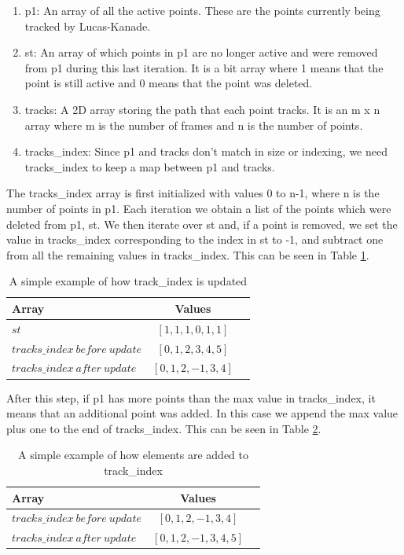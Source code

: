 \documentclass[12pt, onecolumn, conference]{IEEEtran}
\begin{document}
\begin{enumerate}
\item p1: An array of all the active points. These are the points currently being tracked by Lucas-Kanade.
\item st: An array of which points in p1 are no longer active and were removed from p1 during this last iteration. It is a bit array where 1 means that the point is still active and 0 means that the point was deleted.
\item tracks: A 2D array storing the path that each point tracks. It is an m x n array where m is the number of frames and n is the number of points.
\item tracks\_index: Since p1 and tracks don’t match in size or indexing, we need tracks\_index to keep a map between p1 and tracks.
\end{enumerate}

The tracks\_index array is first initialized with values 0 to n-1, where n is the number of points in p1. Each iteration we obtain a list of the points which were deleted from p1, st. We then iterate over st and, if a point is removed, we set the value in tracks\_index corresponding to the index in st to -1, and subtract one from all the remaining values in tracks\_index. This can be seen in Table \ref{table_index}.

\begin{table}[!t]
\caption{A simple example of how track\_index is updated}
\label{table_index}
\centering
\begin{tabular}{ | l | c | r | }
 \hline
 Array & Values\\
  \hline                 
  $st$ & $[1, 1, 1, 0, 1, 1]$\\
  $tracks\_index\ before\ update$ & $[0, 1, 2, 3, 4, 5]$ \\
  $tracks\_index\ after\ update$ & $[0, 1, 2, -1, 3, 4]$ \\
  \hline  
\end{tabular}
\end{table}

After this step, if p1 has more points than the max value in tracks\_index, it means that an additional point was added. In this case we append the max value plus one to the end of tracks\_index. This can be seen in Table \ref{table_index_add}.

\begin{table}[!t]
\caption{A simple example of how elements are added to track\_index}
\label{table_index_add}
\centering
\begin{tabular}{ | l | c | r | }
 \hline
 Array & Values\\
  \hline           
  $tracks\_index\ before\ update$ & $[0, 1, 2, -1, 3, 4]$ \\
  $tracks\_index\ after\ update$ & $[0, 1, 2, -1, 3, 4, 5]$ \\
  \hline  
\end{tabular}
\end{table}
\end{document}

